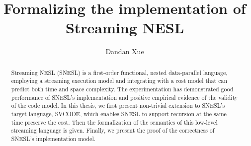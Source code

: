 \documentclass[a4paper]{report}
\title{Formalizing the implementation of Streaming NESL}
\author{Dandan Xue}
\numberwithin{equation}{chapter}
\numberwithin{figure}{chapter}
\begin{document}
\large
\maketitle

\begin{abstract}
 Streaming NESL (SNESL) is a first-order functional, nested data-parallel language, employing a streaming execution model and integrating with a cost model that can predict both time and space complexity.
 The experimentation has demonstrated good performance of SNESL's implementation and positive empirical evidence of the validity of the code model.
 In this thesis, we first present non-trivial extension to SNESL's target language, SVCODE, which enables SNESL to support recursion at the same time preserve the cost.
 Then the formalization of the semantics of this low-level streaming language is given. 
 Finally, we present the proof of the correctness of SNESL's implementation model.
 
\end{abstract}


\tableofcontents





%
%
%




\end{document}
